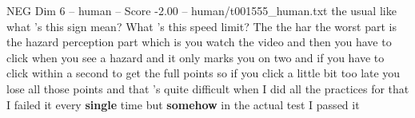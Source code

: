 \begin{textsample}{NEG Dim 6 – human – Score -2.00 – human/t001555\_human.txt}  \label{ex:f6_neg_033}
the usual like what 's this sign mean?
What 's this speed limit?
The the har the worst part is the hazard perception part which is you watch the video and then you have to click when you see a hazard and it only marks you on two and if you have to click within a second to get the full points so if you click a little bit too late you lose all those points and that 's quite difficult when I did all the practices for that I failed it every \textbf{single} time but \textbf{somehow} in the actual test I passed it

\end{textsample}
